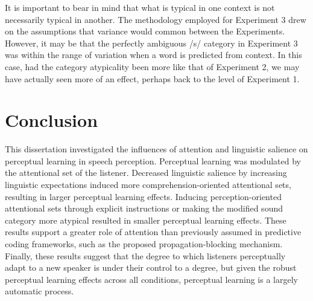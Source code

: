 It is important to bear in mind that what is typical in one context is not necessarily typical in another.  
The methodology employed for Experiment 3 drew on the assumptions that variance would common between the Experiments.  
However, it may be that the perfectly ambiguous /s/ category in Experiment 3 was within the range of variation when a word is predicted from context. 
In this case, had the category atypicality been more like that of Experiment 2, we may have actually seen more of an effect, perhaps back to the level of Experiment 1.

\section{Conclusion}

This dissertation investigated the influences of attention and linguistic salience on perceptual learning in speech perception.
Perceptual learning was modulated by the attentional set of the listener.
Decreased linguistic salience by increasing linguistic expectations induced more comprehension-oriented attentional sets, resulting in larger perceptual learning effects.
Inducing perception-oriented attentional sets through explicit instructions or making the modified sound category more atypical resulted in smaller perceptual learning effects.
These results support a greater role of attention than previously assumed in predictive coding frameworks, such as the proposed propagation-blocking mechanism.
Finally, these results suggest that the degree to which listeners perceptually adapt to a new speaker is under their control to a degree, but given the robust perceptual learning effects across all conditions, perceptual learning is a largely automatic process.


